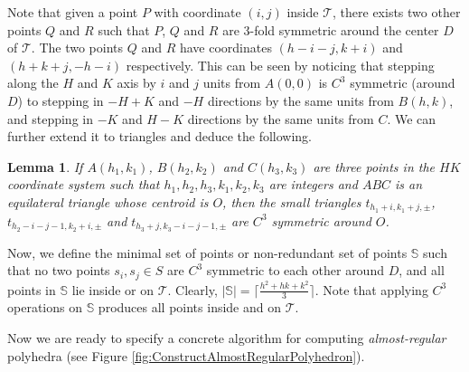 \documentclass[11pt]{article}
\newtheorem{lemma}[thm]{Lemma}
\newcommand{\1}{\mathds{1}}
\begin{document}
Note that given a point $P$ with coordinate $(i,j)$ inside $\mathcal{T}$, there exists two other points $Q$ and $R$ such that $P$, $Q$ and $R$ are 3-fold symmetric around the center $D$ of $\mathcal{T}$. The two points $Q$ and $R$ have coordinates $(h-i-j, k+i)$ and $(h+k+j,-h-i)$ respectively. This can be seen by noticing that stepping along the $H$ and $K$ axis by $i$ and $j$ units from $A(0,0)$ is $C^3$ symmetric (around $D$) to stepping in $-H+K$ and $-H$ directions by the same units from $B(h,k)$, and stepping in $-K$ and $H-K$ directions by the same units from $C$. We can further extend it to triangles and deduce the following.

\begin{lemma}
If $A(h_1, k_1)$, $B(h_2, k_2)$ and $C(h_3, k_3)$ are three points in the $HK$ coordinate system such that $h_1, h_2, h_3, k_1, k_2, k_3$ are integers and $ABC$ is an equilateral triangle whose centroid is $O$, then the small triangles $t_{h_1+i,k_1+j,\pm}$, $t_{h_2-i-j-1,k_2+i,\pm}$ and $t_{h_3+j,k_3-i-j-1,\pm}$ are $C^3$ symmetric around $O$.
\label{lem:trisym2}
\end{lemma}

Now, we define the minimal set of points or non-redundant set of points $\mathbb{S}$ such that no two points $s_i,s_j\in S$ are $C^3$ symmetric to each other around $D$, and all points in $\mathbb{S}$ lie inside or on $\mathcal{T}$. Clearly, $|\mathbb{S}| = \lceil\frac{h^2+hk+k^2}{3}\rceil$. Note that applying $C^3$ operations on $\mathbb{S}$ produces all points inside and on $\mathcal{T}$.

Now we are ready to specify a concrete algorithm for computing \emph{almost-regular} polyhedra (see Figure \ref{fig:ConstructAlmostRegularPolyhedron}).
\end{document}
